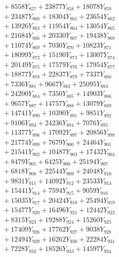 \documentclass[a4paper,10pt]{article}
\begin{document}
{\begin{align}
&\;  + 8558 Y_{857} + 23877 Y_{858} + 18078 Y_{859} \\[0.3ex]
&\;  + 23487 Y_{860} + 18304 Y_{861} + 23654 Y_{862} \\[0.3ex]
&\;  + 13926 Y_{863} + 11954 Y_{864} + 13054 Y_{865} \\[0.3ex]
&\;  + 21684 Y_{866} + 20330 Y_{867} + 19438 Y_{868} \\[0.5ex]\allowbreak
&\;  + 11074 Y_{869} + 7030 Y_{870} + 10823 Y_{871} \\[0.3ex]
&\;  + 18099 Y_{872} + 15190 Y_{873} + 13007 Y_{874} \\[0.3ex]
&\;  + 20149 Y_{875} + 17579 Y_{876} + 17954 Y_{877} \\[0.3ex]
&\;  + 18877 Y_{878} + 22837 Y_{879} + 7337 Y_{880} \\[0.3ex]
&\;  + 7336 Y_{881} + 9667 Y_{882} + 25095 Y_{883} \\[0.3ex]
&\;  + 24200 Y_{884} + 7350 Y_{885} + 14903 Y_{886} \\[0.3ex]
&\;  + 9657 Y_{887} + 14757 Y_{888} + 13079 Y_{889} \\[0.3ex]
&\;  + 14741 Y_{890} + 10390 Y_{891} + 9851 Y_{892} \\[0.3ex]
&\;  + 9106 Y_{893} + 24236 Y_{894} + 7076 Y_{895} \\[0.3ex]
&\;  + 11377 Y_{896} + 17092 Y_{897} + 20856 Y_{898} \\[0.5ex]\allowbreak
&\;  + 21774 Y_{899} + 7679 Y_{900} + 24464 Y_{901} \\[0.3ex]
&\;  + 21541 Y_{902} + 10487 Y_{903} + 17432 Y_{904} \\[0.3ex]
&\;  + 8479 Y_{905} + 6425 Y_{906} + 25194 Y_{907} \\[0.3ex]
&\;  + 6818 Y_{908} + 22544 Y_{909} + 24048 Y_{910} \\[0.3ex]
&\;  + 9831 Y_{911} + 14092 Y_{912} + 23533 Y_{913} \\[0.3ex]
&\;  + 15441 Y_{914} + 7594 Y_{915} + 9059 Y_{916} \\[0.3ex]
&\;  + 15035 Y_{917} + 20424 Y_{918} + 25494 Y_{919} \\[0.3ex]
&\;  + 15477 Y_{920} + 16496 Y_{921} + 12442 Y_{922} \\[0.3ex]
&\;  + 8315 Y_{923} + 19288 Y_{924} + 15260 Y_{925} \\[0.3ex]
&\;  + 17409 Y_{926} + 17762 Y_{927} + 9038 Y_{928} \\[0.5ex]\allowbreak
&\;  + 12494 Y_{929} + 16262 Y_{930} + 22284 Y_{931} \\[0.3ex]
&\;  + 7228 Y_{932} + 18526 Y_{933} + 14597 Y_{934} \\[0.3ex]

\end{align}}
\end{document}

